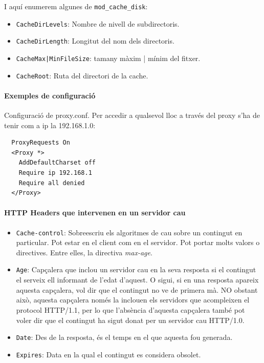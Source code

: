 \documentclass[a4paper, 11pt]{article}
\begin{document}
I aquí enumerem algunes de \verb+mod_cache_disk+:
\begin{itemize}
	\item \verb+CacheDirLevels+: Nombre de nivell de subdirectoris.
	\item \verb+CacheDirLength+: Longitut del nom dels directoris.
	\item \verb+CacheMax|MinFileSize+: tamany màxim | mínim del fitxer.
	\item \verb+CacheRoot+: Ruta del directori de la cache.
\end{itemize}

\paragraph{Exemples de configuració \\}

Configuració de proxy.conf. Per accedir a qualsevol lloc a trav\'es del proxy s'ha de tenir com a ip la 192.168.1.0:

\begin{verbatim}
  ProxyRequests On
  <Proxy *>
    AddDefaultCharset off
    Require ip 192.168.1
    Require all denied
  </Proxy>
\end{verbatim}

\paragraph{HTTP Headers que intervenen en un servidor cau}

\begin{itemize}
	\item \verb+Cache-control+: Sobreescriu els algoritmes de cau sobre un contingut en particular. Pot estar en el client com en el servidor. Pot portar molts valors o directives. Entre elles, la directiva \textit{max-age}.
	\item \verb+Age+: Capçalera que inclou un servidor cau en la seva resposta si el contingut el serveix ell informant de l'edat d'aquest. O sigui, si en una resposta apareix aquesta capçalera, vol dir que el contingut no ve de primera mà. NO obstant això, aquesta capçalera nom\'es la inclouen els servidors que acompleixen el protocol HTTP/1.1, per lo que l'absència d'aquesta capçalera tamb\'e pot voler dir que el contingut ha sigut donat per un servidor cau HTTP/1.0.
	\item \verb+Date+: Des de la resposta, \'es el temps en el que aquesta fou generada.
	\item \verb+Expires+: Data en la qual el contingut es considera obsolet.
\end{itemize}
\end{document}
